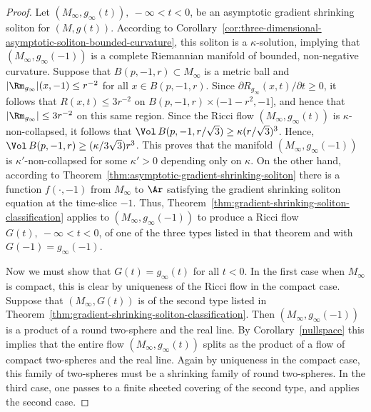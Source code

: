 \begin{proof}
Let $(M_\infty,g_\infty(t)),\ -\infty<t<0$, be an asymptotic
gradient shrinking soliton for $(M,g(t))$. According to
Corollary~\ref{cor:three-dimensional-asymptotic-soliton-bounded-curvature}, this soliton is a $\kappa$-solution,
implying that $(M_\infty,g_\infty(-1))$ is a complete Riemannian
manifold of bounded, non-negative curvature. Suppose that
$B(p,-1,r)\subset M_\infty$ is a metric ball and $|\Rm_{g_\infty}|(x,-1)\le r^{-2}$ for all $x\in B(p,-1,r)$. Since
$\partial R_{g_\infty}(x,t)/\partial t\ge 0$, it follows that
$R(x,t)\le 3r^{-2}$ on $B(p,-1,r)\times (-1-r^2,-1]$, and hence that
$|\Rm_{g_\infty}|\le 3r^{-2}$ on this same region. Since the
Ricci flow $(M_\infty,g_\infty(t))$ is $\kappa$-non-collapsed, it
follows that $\Vol\, B(p,-1,r/\sqrt{3})\ge
\kappa(r/\sqrt{3})^3$. Hence, $\Vol\, B(p,-1,r)\ge
(\kappa/3\sqrt{3})r^3$. This proves that the manifold
$(M_\infty,g_\infty(-1))$ is $\kappa'$-non-collapsed for some
$\kappa'>0$ depending only on $\kappa$. On the other hand, according
to Theorem~\ref{thm:asymptotic-gradient-shrinking-soliton} there is a function $f(\cdot, -1)$ from
$M_\infty$ to $\Ar$ satisfying the gradient shrinking soliton
equation at the time-slice $-1$.
 Thus,
Theorem~\ref{thm:gradient-shrinking-soliton-classification} applies to $(M_\infty,g_\infty(-1))$ to
produce a Ricci flow $G(t),\ -\infty<t<0$, of one of the three types
listed in that theorem and with $G(-1)=g_\infty(-1)$.

Now we must show that $G(t)=g_\infty(t)$ for all $t<0$. In the first
case when $M_\infty$ is compact, this is clear by uniqueness of the
Ricci flow in the compact case. Suppose that $(M_\infty,G(t))$ is of
the second type listed in Theorem~\ref{thm:gradient-shrinking-soliton-classification}. Then
$(M_\infty,g_\infty(-1))$ is a product of a round two-sphere and the
real line. By Corollary~\ref{nullspace} this implies that the entire
flow $(M_\infty,g_\infty(t))$ splits as the product of a flow of
compact two-spheres and the real line. Again by uniqueness in the
compact case, this family of two-spheres must be a shrinking family
of round two-spheres. In the third case, one passes to a finite
sheeted covering of the second type, and applies the second case.
\end{proof}






